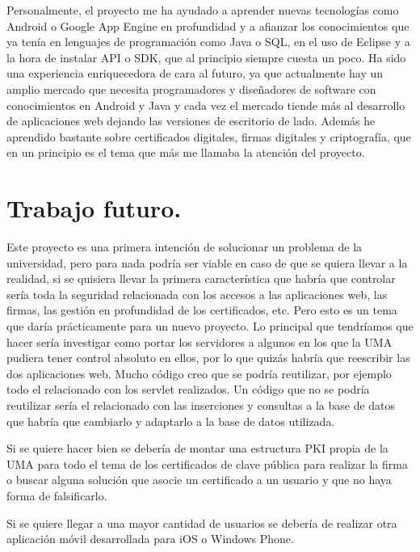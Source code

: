 Personalmente, el proyecto me ha ayudado a aprender nuevas tecnologías como Android o Google App Engine en profundidad y a afianzar los conocimientos que ya tenía en lenguajes de programación como Java o SQL, en el uso de Eclipse y a la hora de instalar API o SDK, que al principio siempre cuesta un poco. Ha sido una experiencia enriquecedora de cara al futuro, ya que actualmente hay un amplio mercado que necesita programadores y diseñadores de software con conocimientos en Android y Java y cada vez el mercado tiende más al desarrollo de aplicaciones web dejando las versiones de escritorio de lado. Además he aprendido bastante sobre certificados digitales, firmas digitales y criptografía, que en un principio es el tema que más me llamaba la atención del proyecto.

\section{Trabajo futuro.}

Este proyecto es una primera intención de solucionar un problema de la universidad, pero para nada podría ser viable en caso de que se quiera llevar a la realidad, si se quisiera llevar la primera característica que habría que controlar sería toda la seguridad relacionada con los accesos a las aplicaciones web, las firmas, las gestión en profundidad de los certificados, etc. Pero esto es un tema que daría prácticamente para un nuevo proyecto. Lo principal que tendríamos que hacer sería investigar como portar los servidores a algunos en los que la UMA pudiera tener control absoluto en ellos, por lo que quizás habría que reescribir las dos aplicaciones web. Mucho código creo que se podría reutilizar, por ejemplo todo el relacionado con los servlet realizados. Un código que no se podría reutilizar sería el relacionado con las inserciones y consultas a la base de datos que habría que cambiarlo y adaptarlo a la base de datos utilizada.

Si se quiere hacer bien se debería de montar una estructura PKI propia de la UMA para todo el tema de los certificados de clave pública para realizar la firma o buscar alguna solución que asocie un certificado a un usuario y que no haya forma de falsificarlo.

Si se quiere llegar a una mayor cantidad de usuarios se debería de realizar otra aplicación móvil desarrollada para iOS o Windows Phone.

